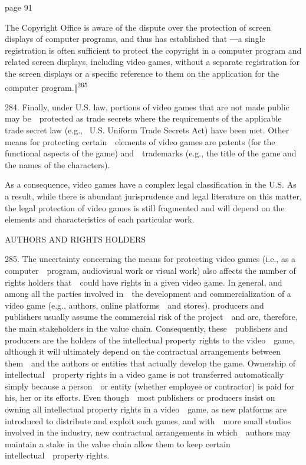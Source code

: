 \documentclass[
]{article}
\begin{document}
{page 91}

{The Copyright Office is aware of the dispute over the protection of
screen displays of }{computer programs, and thus has established that
―}{a single registration is often sufficient to protect the copyright in
a computer program and related screen displays, including video games,
without a separate registration for the screen displays or a specific
}{reference to them on the application for the computer
program.‖}\textsuperscript{{265}}

{284. }{Finally, under U.S. law, portions of video games that are not
made public may be~~protected as trade secrets where the requirements of
the applicable trade secret law (e.g., }{~U.S. Uniform Trade Secrets
Act}{) have been met. Other means for protecting certain~~elements of
video games are patents (for the functional aspects of the game)
and~~trademarks (e.g., the title of the game and the names of the
characters).}

{As a consequence, video games have a complex legal classification in
the U.S. As a result, while there is abundant jurisprudence and legal
literature on this matter, the legal protection of video games is still
fragmented and will depend on the elements and characteristics of each
particular work.}

{AUTHORS AND RIGHTS HOLDERS}

{285. }{The uncertainty concerning the means for protecting video games
(i.e., as a computer~~program, audiovisual work or visual work) also
affects the number of rights holders that~~could have rights in a given
video game. In general, and among all the parties involved in~~the
development and commercialization of a video game (e.g., authors, online
platforms~~and stores), producers and publishers usually assume the
commercial risk of the project~~and are, therefore, the main
stakeholders in the value chain. Consequently, these~~publishers and
producers are the holders of the intellectual property rights to the
video~~game, although it will ultimately depend on the contractual
arrangements between them~~and the authors or entities that actually
develop the game. Ownership of intellectual~~property rights in a video
game is not transferred automatically simply because a person~~or entity
(whether employee or contractor) is paid for his, her or its efforts.
Even though~~most publishers or producers insist on owning all
intellectual property rights in a video~~game, as new platforms are
introduced to distribute and exploit such games, and with~~more small
studios involved in the industry, new contractual arrangements in
which~~authors may maintain a stake in the value chain allow them to
keep certain intellectual~~property rights.}
\end{document}
